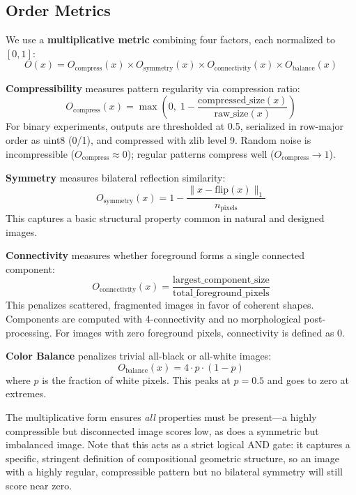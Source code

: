 \documentclass{article}
\begin{document}
\subsection{Order Metrics}
\label{sec:metrics}

We use a \textbf{multiplicative metric} combining four factors, each normalized to $[0,1]$:
\begin{equation}
    O(x) = O_{\text{compress}}(x) \times O_{\text{symmetry}}(x) \times O_{\text{connectivity}}(x) \times O_{\text{balance}}(x)
\label{eq:order}
\end{equation}

\textbf{Compressibility} measures pattern regularity via compression ratio:
\begin{equation}
    O_{\text{compress}}(x) = \max\!\left(0,\;1 - \frac{\text{compressed\_size}(x)}{\text{raw\_size}(x)}\right)
\end{equation}
For binary experiments, outputs are thresholded at 0.5, serialized in row-major order as uint8 (0/1), and compressed with zlib level 9. Random noise is incompressible ($O_{\text{compress}} \approx 0$); regular patterns compress well ($O_{\text{compress}} \to 1$).

\textbf{Symmetry} measures bilateral reflection similarity:
\begin{equation}
    O_{\text{symmetry}}(x) = 1 - \frac{\|x - \text{flip}(x)\|_1}{n_{\text{pixels}}}
\end{equation}
This captures a basic structural property common in natural and designed images.

\textbf{Connectivity} measures whether foreground forms a single connected component:
\begin{equation}
    O_{\text{connectivity}}(x) = \frac{\text{largest\_component\_size}}{\text{total\_foreground\_pixels}}
\end{equation}
This penalizes scattered, fragmented images in favor of coherent shapes. Components are computed with 4-connectivity and no morphological post-processing. For images with zero foreground pixels, connectivity is defined as 0.

\textbf{Color Balance} penalizes trivial all-black or all-white images:
\begin{equation}
    O_{\text{balance}}(x) = 4 \cdot p \cdot (1-p)
\end{equation}
where $p$ is the fraction of white pixels. This peaks at $p=0.5$ and goes to zero at extremes.

The multiplicative form ensures \emph{all} properties must be present---a highly compressible but disconnected image scores low, as does a symmetric but imbalanced image. Note that this acts as a strict logical AND gate: it captures a specific, stringent definition of compositional geometric structure, so an image with a highly regular, compressible pattern but no bilateral symmetry will still score near zero.
\end{document}
